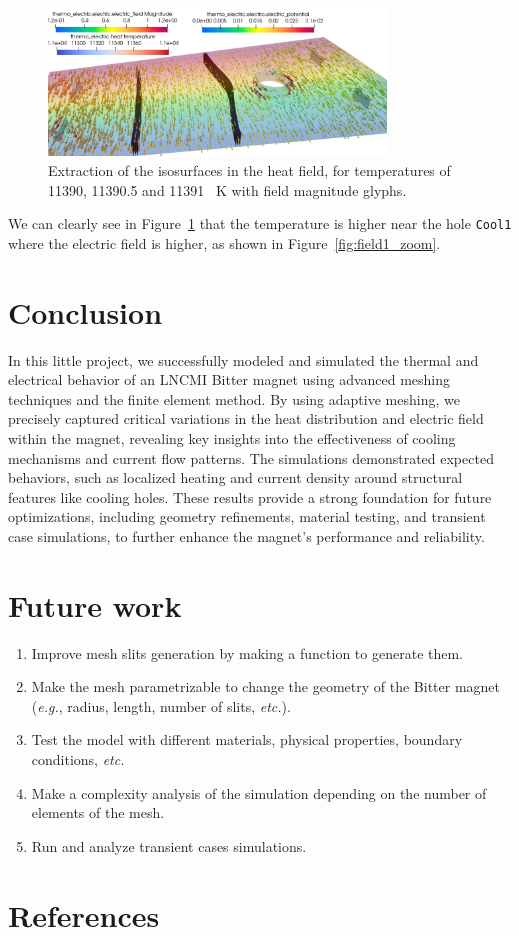\documentclass[12pt]{article}
\begin{document}
\begin{figure}[H]
  \centering
  \includegraphics[width=0.8\textwidth]{images/isosurfaces_glyph.png}
  \caption{Extraction of the isosurfaces in the heat field, for temperatures of
  11390, 11390.5 and 11391 \SI{}{\kelvin} with field magnitude glyphs.}
  \label{fig:isosurfaces_glyph}
\end{figure}

We can clearly see in Figure~\ref{fig:isosurfaces_glyph} that the temperature is higher
near the hole \texttt{Cool1} where the electric field is higher, as shown in
Figure~\ref{fig:field1_zoom}.

\section{Conclusion}
In this little project, we successfully modeled and simulated the thermal and electrical
behavior of an LNCMI Bitter magnet using advanced meshing techniques and the finite
element method. By using adaptive meshing, we precisely captured critical variations
in the heat distribution and electric field within the magnet, revealing key insights
into the effectiveness of cooling mechanisms and current flow patterns. The
simulations demonstrated expected behaviors, such as localized heating and current
density around structural features like cooling holes. These results provide a
strong foundation for future optimizations, including geometry refinements, material
testing, and transient case simulations, to further enhance the magnet's performance
and reliability.

\section{Future work}
\begin{enumerate}
  \item Improve mesh slits generation by making a function to generate them.
  \item Make the mesh parametrizable to change the geometry of the Bitter magnet
    (\textit{e.g.}, radius, length, number of slits, \textit{etc.}).
  \item Test the model with different materials, physical properties, boundary conditions, \textit{etc.}
  \item Make a complexity analysis of the simulation depending on the number of elements of the mesh.
  \item Run and analyze transient cases simulations.
\end{enumerate}

\newpage

\section{References}
\printbibliography
\end{document}
